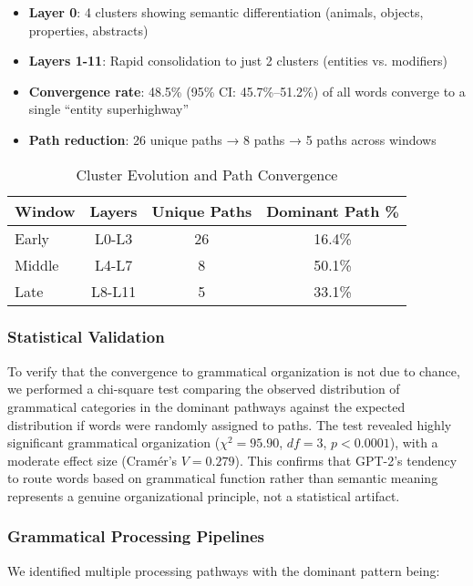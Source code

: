 \begin{itemize}
    \item \textbf{Layer 0}: 4 clusters showing semantic differentiation (animals, objects, properties, abstracts)
    \item \textbf{Layers 1-11}: Rapid consolidation to just 2 clusters (entities vs. modifiers)
    \item \textbf{Convergence rate}: 48.5\% (95\% CI: 45.7\%–51.2\%) of all words converge to a single ``entity superhighway''
    \item \textbf{Path reduction}: 26 unique paths → 8 paths → 5 paths across windows
\end{itemize}

\begin{table}[h!]
\centering
\caption{Cluster Evolution and Path Convergence}
\label{tab:cluster_evolution}
\begin{tabular}{lccc}
\toprule
Window & Layers & Unique Paths & Dominant Path \% \\
\midrule
Early & L0-L3 & 26 & 16.4\% \\
Middle & L4-L7 & 8 & 50.1\% \\
Late & L8-L11 & 5 & 33.1\% \\
\bottomrule
\end{tabular}
\end{table}

\subsubsection{Statistical Validation}

To verify that the convergence to grammatical organization is not due to chance, we performed a chi-square test comparing the observed distribution of grammatical categories in the dominant pathways against the expected distribution if words were randomly assigned to paths. The test revealed highly significant grammatical organization ($\chi^2 = 95.90$, $df = 3$, $p < 0.0001$), with a moderate effect size (Cramér's $V = 0.279$). This confirms that GPT-2's tendency to route words based on grammatical function rather than semantic meaning represents a genuine organizational principle, not a statistical artifact.

\subsubsection{Grammatical Processing Pipelines}

We identified multiple processing pathways with the dominant pattern being:

